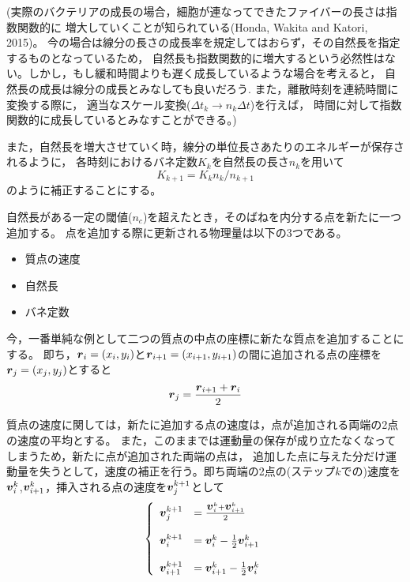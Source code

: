 (実際のバクテリアの成長の場合，細胞が連なってできたファイバーの長さは指数関数的に
増大していくことが知られている(Honda, Wakita and Katori, 2015)。
今の場合は線分の長さの成長率を規定してはおらず，その自然長を指定するものとなっているため，
自然長も指数関数的に増大するという必然性はない。しかし，もし緩和時間よりも遅く成長しているような場合を考えると，
自然長の成長は線分の成長とみなしても良いだろう.
また，離散時刻を連続時間に変換する際に， 適当なスケール変換($\Delta t_{k} \rightarrow n_{k}\Delta t$)を行えば，
時間に対して指数関数的に成長しているとみなすことができる。)

また，自然長を増大させていく時，線分の単位長さあたりのエネルギーが保存されるように，
各時刻におけるバネ定数$K_{k}$を自然長の長さ$n_{k}$を用いて
$$K_{k+1} = K_{k} n_{k} / n_{k+1}$$
のように補正することにする。

自然長がある一定の閾値($n_{c}$)を超えたとき，そのばねを内分する点を新たに一つ追加する。
点を追加する際に更新される物理量は以下の3つである。

\begin{itemize}
\itemsep1pt\parskip0pt
\item
  質点の速度
\item
  自然長
\item
  バネ定数
\end{itemize}

今，一番単純な例として二つの質点の中点の座標に新たな質点を追加することにする。
即ち，$\mbox{\boldmath \(r\)}_{i} = (x_{i}, y_{i})$と$\mbox{\boldmath \(r\)}_{i+1} = (x_{i+1}, y_{i+1})$の間に追加される点の座標を$\mbox{\boldmath \(r\)}_{j} = (x_{j},y_{j})$とすると
\[\mbox{\boldmath \(r\)}_{j} = \frac{\mbox{\boldmath \(r\)}_{i+1} + \mbox{\boldmath \(r\)}_{i}}{2}\]

質点の速度に関しては，新たに追加する点の速度は，点が追加される両端の2点の速度の平均とする。
また，このままでは運動量の保存が成り立たなくなってしまうため，新たに点が追加された両端の点は，
追加した点に与えた分だけ運動量を失うとして，速度の補正を行う。即ち両端の2点の(ステップ$k$での)速度を$\mbox{\boldmath \(v\)}_{i}^{k}$,$\mbox{\boldmath \(v\)}_{i+1}^{k}$，挿入される点の速度を$\mbox{\boldmath \(v\)}_{j}^{k+1}$として
\begin{eqnarray*}
  \left\{
    \begin{array}{rl}
  \mbox{\boldmath \(v\)}_{j}^{k+1} &= \frac{\mbox{\boldmath \(v\)}_{i}^{k} + \mbox{\boldmath \(v\)}_{i+1}^{k}}{2} \\\\
  \mbox{\boldmath \(v\)}_{i}^{k+1} &= \mbox{\boldmath \(v\)}_{i}^{k} - \frac{1}{2}\mbox{\boldmath \(v\)}_{i+1}^{k} \\\\
  \mbox{\boldmath \(v\)}_{i+1}^{k+1} &= \mbox{\boldmath \(v\)}_{i+1}^{k} - \frac{1}{2}\mbox{\boldmath \(v\)}_{i}^{k}
  \end{array}\right.
\end{eqnarray*}



